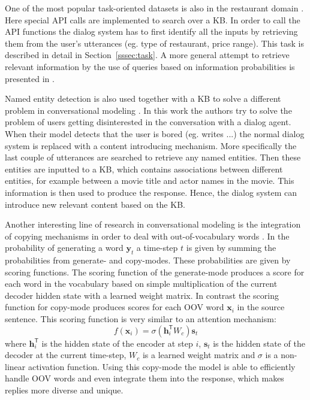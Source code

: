 \documentclass[12pt]{article}
\begin{document}
One of the most popular task-oriented datasets is also in the restaurant domain \cite{Joshi:2017}. Here special API calls are implemented to search over a KB. In order to call the API functions the dialog system has to first identify all the inputs by retrieving them from the user's utterances (eg. type of restaurant, price range). This task is described in detail in Section~\ref{sssec:task}. A more general attempt to retrieve relevant information by the use of queries based on information probabilities is presented in \cite{Yin:2017}.

Named entity detection is also used together with a KB to solve a different problem in conversational modeling \cite{stalemate:2016}. In this work the authors try to solve the problem of users getting disinterested in the conversation with a dialog agent. When their model detects that the user is bored (eg. writes ...) the normal dialog system is replaced with a content introducing mechanism. More specifically the last couple of utterances are searched to retrieve any named entities. Then these entities are inputted to a KB, which contains associations between different entities, for example between a movie title and actor names in the movie. This information is then used to produce the response. Hence, the dialog system can introduce new relevant content based on the KB.

Another interesting line of research in conversational modeling is the integration of copying mechanisms in order to deal with out-of-vocabulary words \cite{Eric:2017,Gu:2016}. In \cite{Gu:2016} the probability of generating a word \(\bm{y}_t\) a time-step \(t\) is given by summing the probabilities from generate- and copy-modes. These probabilities are given by scoring functions. The scoring function of the generate-mode produces a score for each word in the vocabulary based on simple multiplication of the current decoder hidden state with a learned weight matrix. In contrast the scoring function for copy-mode produces scores for each OOV word \(\bm{x}_i\) in the source sentence. This scoring function is very similar to an attention mechanism:
\begin{equation}
f(\bm{x}_i)=\sigma(\bm{h}_{i}^{\mathsf{T}}W_c)\bm{s}_t
\end{equation}
where \(\bm{h}_{i}^{\mathsf{T}}\) is the hidden state of the encoder at step \(i\), \(\bm{s}_t\) is the hidden state of the decoder at the current time-step, \(W_c\) is a learned weight matrix and \(\sigma\) is a non-linear activation function. Using this copy-mode the model is able to efficiently handle OOV words and even integrate them into the response, which makes replies more diverse and unique.
\end{document}
